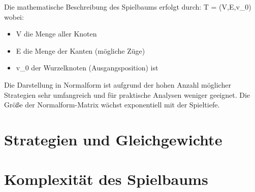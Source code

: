 Die mathematische Beschreibung des Spielbaums erfolgt durch:
T = (V,E,v_0) 
wobei:
\begin{itemize}
	\item V die Menge aller Knoten
	\item E die Menge der Kanten (mögliche Züge)
	\item v_0 der Wurzelknoten (Ausgangsposition) ist
\end{itemize}

Die Darstellung in Normalform ist aufgrund der hohen Anzahl möglicher Strategien sehr umfangreich und für praktische Analysen weniger geeignet. Die Größe der Normalform-Matrix wächst exponentiell mit der Spieltiefe.

\section{Strategien und Gleichgewichte}
\section{Komplexität des Spielbaums}
	